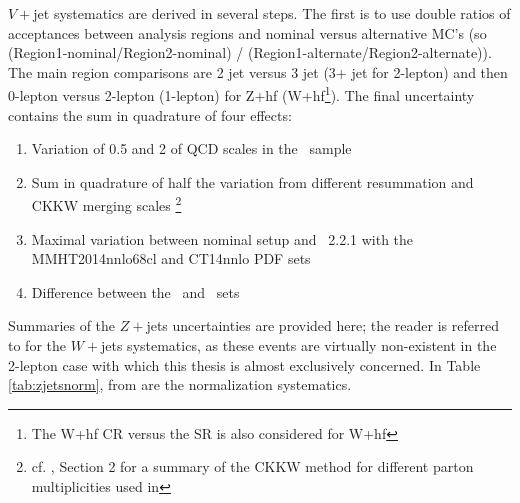 $V+$jet systematics are derived in several steps.  The first is to use double ratios of acceptances between analysis regions and nominal versus alternative MC's (so (Region1-nominal/Region2-nominal) / (Region1-alternate/Region2-alternate)).  The main region comparisons are 2 jet versus 3 jet (3+ jet for 2-lepton) and then 0-lepton versus 2-lepton (1-lepton) for Z+hf (W+hf\footnote{The W+hf CR versus the SR is also considered for W+hf}).  The final uncertainty contains the sum in quadrature of four effects:
\begin{enumerate}
\item Variation of 0.5 and 2 of QCD scales in the \sherpa\, sample
\item Sum in quadrature of half the variation from different resummation and CKKW merging scales \footnote{cf. \cite{modeling25}, Section 2 for a summary of the CKKW method for different parton multiplicities used in \sherpa}
\item Maximal variation between nominal setup and \sherpa\, 2.2.1 with the MMHT2014nnlo68cl and CT14nnlo PDF sets
\item Difference between the \sherpa\, and \mg\, sets
\end{enumerate}

Summaries of the $Z+$jets uncertainties are provided here; the reader is referred to \cite{modelingnote} for the $W+$jets systematics, as these events are virtually non-existent in the 2-lepton case with which this thesis is almost exclusively concerned.  In Table \ref{tab:zjetsnorm}, from \cite{modelingnote} are the normalization systematics.

